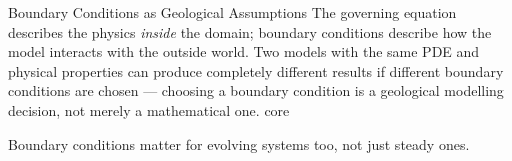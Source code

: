 \begin{activity}{Boundary Conditions as Geological Assumptions}
{    The governing equation describes the physics \emph{inside} the domain; boundary conditions describe how the model interacts with the outside world.  Two models with the same PDE and physical properties can produce completely different results if different boundary conditions are chosen — choosing a boundary condition is a geological modelling decision, not merely a mathematical one.
}{core}








\begin{questions}
    Boundary conditions matter for evolving systems too, not just steady ones.


\end{questions}
\end{activity}
